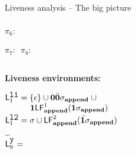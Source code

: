 \documentclass[xcolor=x11names,compress,mathserif]{beamer}
\renewcommand{\(}{\begin{columns}}
\renewcommand{\)}{\end{columns}}
\newcommand{\<}[1]{\begin{column}{#1}}
\renewcommand{\>}{\end{column}}
\begin{document}
\begin{frame}[t]{Liveness analysis -- The big picture}
\begin{columns}[c]
\begin{column}[T]{0.6\textwidth}
{\begin{uprogram}
          \hspace*{-2.4cm} \hspace*{.05cm}   $\pi_6\!\!:\, $


          \hspace*{-2.7cm}  \hspace*{.05cm}   $\pi_7\!\!:\,$
$\pi_8\!\!:\, $ 
\end{uprogram}}
 \end{column}
\end{columns}

\bigskip
\bigskip

\footnotesize
\begin{columns}[c]
 \begin{column}[T]{0.40\textwidth}
\scriptsize
\centerline{\bf Liveness environments:}

\bigskip

$\mathsf{L}_{{1}}^{\mbox{\tt l1}} = \{\epsilon\} \cup  \mathbf{0}\bar{\mathbf{0}}\sigma_{\mathbf{append}}\; \cup $\\
$\;\;\;\;\;\;\;\;\;\;\;\mathbf{1}\mathsf{LF}_{\mathit {\mathbf{append}}}^{1}( {\mathit {\bar{\mathbf{1}}}\sigma_{\mathbf{append}}})$\\
$\mathsf{L}_{{1}}^{\mbox{\tt l2}} = \sigma \cup \mathsf{LF}_{\mathit {\mathbf{append}}}^{2}( {\mathit {\bar{\mathbf{1}}}\sigma_{\mathbf{append}}})$\\
\ldots\\
$\mathsf{L}_{{9}}^{\mbox{\tt y}}  = $  \\



\end{column}
\end{columns}
\end{frame}
\end{document}
